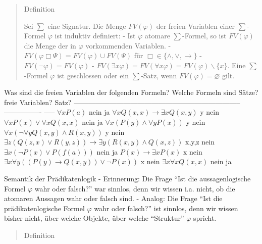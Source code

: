 \documentclass[a4paper]{article}
\begin{document}
\begin{multicols}{3}
  \begin{quote}
    Definition

    Sei $\sum$ eine Signatur. Die Menge $FV(\varphi)$ der freien Variablen
    einer $\sum$-Formel $\varphi$ ist induktiv definiert: - Ist $\varphi$
    atomare $\sum$-Formel, so ist $FV(\varphi)$ die Menge der in $\varphi$
    vorkommenden Variablen. -
    $FV(\varphi\Box\Psi) =FV(\varphi)\cup FV(\Psi)$ für
    $\Box\in\{\wedge,\vee,\rightarrow\}$ - $FV(\lnot\varphi) =FV(\varphi)$ -
    $FV(\exists x\varphi) =FV(\forall x\varphi) =FV(\varphi)\backslash\{x\}$.
    Eine $\sum$-Formel $\varphi$ ist geschlossen oder ein $\sum$-Satz, wenn
    $FV(\varphi)=\varnothing$ gilt.
  \end{quote}

  Was sind die freien Variablen der folgenden Formeln? Welche Formeln sind
  Sätze? \textbar{} \textbar{} freie Variablen? \textbar{} Satz?
  \textbar{} \textbar{}
  -----------------------------------------------------------------------
  \textbar{} ---------------- \textbar{} ----- \textbar{} \textbar{}
  $\forall x P(a)$ \textbar{} nein \textbar{} ja \textbar{} \textbar{}
  $\forall x Q(x,x)\rightarrow\exists x Q(x,y)$ \textbar{} y \textbar{}
  nein \textbar{} \textbar{} $\forall x P(x)\vee\forall x Q(x,x)$
  \textbar{} nein \textbar{} ja \textbar{} \textbar{}
  $\forall x(P(y)\wedge\forall y P(x))$ \textbar{} y \textbar{} nein
  \textbar{} \textbar{} $\forall x(\lnot\forall y Q(x,y)\wedge R(x,y))$
  \textbar{} y \textbar{} nein \textbar{} \textbar{}
  $\exists z(Q(z,x)\vee R(y,z))\rightarrow\exists y(R(x,y)\wedge Q(x,z))$
  \textbar{} x,y,z \textbar{} nein \textbar{} \textbar{}
  $\exists x(\lnot P(x)\vee P(f(a)))$ \textbar{} nein \textbar{} ja
  \textbar{} \textbar{} $P(x)\rightarrow\exists x P(x)$ \textbar{} x
  \textbar{} nein \textbar{} \textbar{}
  $\exists x\forall y((P(y)\rightarrow Q(x,y))\vee\lnot P(x))$ \textbar{}
  x \textbar{} nein \textbar{} \textbar{} $\exists x\forall x Q(x,x)$
  \textbar{} nein \textbar{} ja \textbar{}

  Semantik der Prädikatenlogik - Erinnerung: Die Frage ``Ist die
  aussagenlogische Formel $\varphi$ wahr oder falsch?'' war sinnlos, denn
  wir wissen i.a. nicht, ob die atomaren Aussagen wahr oder falsch sind. -
  Analog: Die Frage ``Ist die prädikatenlogische Formel $\varphi$ wahr
  oder falsch?'' ist sinnlos, denn wir wissen bisher nicht, über welche
  Objekte, über welche ``Struktur'' $\varphi$ spricht.

  \begin{quote}
    Definition


\end{quote}
\end{multicols}
\end{document}

